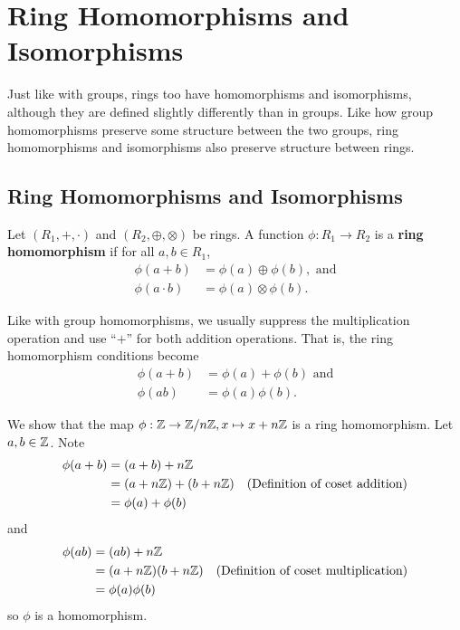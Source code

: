 \chapter{Ring Homomorphisms and Isomorphisms}
Just like with groups, rings too have homomorphisms and isomorphisms, although they are defined slightly differently than in groups. Like how group homomorphisms preserve some structure between the two groups, ring homomorphisms and isomorphisms also preserve structure between rings.

\section{Ring Homomorphisms and Isomorphisms}
\begin{definition}
    Let $(R_1, +, \cdot)$ and $(R_2, \oplus, \otimes)$ be rings. A function $\phi: R_1 \to R_2$ is a \textbf{ring homomorphism} if for all $a, b \in R_1$,
    \begin{align*}
        \phi(a+b) &= \phi(a) \oplus \phi(b), \text{ and}\\
        \phi(a\cdot b) &= \phi(a)\otimes\phi(b).
    \end{align*}
\end{definition}
\begin{remark}
    Like with group homomorphisms, we usually suppress the multiplication operation and use ``$+$'' for both addition operations. That is, the ring homomorphism conditions become
    \begin{align*}
        \phi(a+b) &= \phi(a) + \phi(b) \text{ and}\\
        \phi(ab) &= \phi(a)\phi(b).
    \end{align*}
\end{remark}

\begin{example}
    We show that the map $\phi: \mathbb{Z} \to \mathbb{Z}/n\mathbb{Z}, x \mapsto x + n\mathbb{Z}$ is a ring homomorphism. Let $a, b \in \mathbb{Z}$. Note
    \begin{align*}
        \phi(a+b) &= (a+b) + n\mathbb{Z}\\
        &= (a + n\mathbb{Z}) + (b + n\mathbb{Z}) & (\text{Definition of coset addition})\\
        &=\phi(a)+\phi(b)
    \end{align*}
    and
    \begin{align*}
        \phi(ab) &= (ab) + n\mathbb{Z}\\
        &= (a + n\mathbb{Z})(b + n\mathbb{Z}) & (\text{Definition of coset multiplication})\\
        &= \phi(a)\phi(b)
    \end{align*}
    so $\phi$ is a homomorphism.
\end{example}

